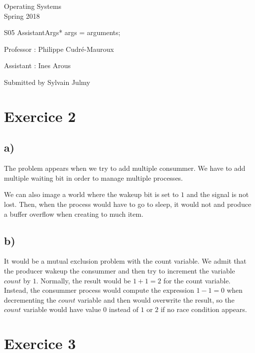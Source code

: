 \documentclass[a4paper,11pt]{report}
\author{Sylvain Julmy}
\date{\today}
\begin{document}
\begin{center}
  \Large{
    Operating Systems\\
    Spring 2018
  }
  
  \noindent\makebox[\linewidth]{\rule{\linewidth}{0.4pt}}
  S05
  \noindent\makebox[\linewidth]{\rule{\linewidth}{0.4pt}}
    AssistantArgs* args = arguments;
  \begin{flushleft}
    Professor : Philippe Cudré-Mauroux

    Assistant : Ines Arous
  \end{flushleft}
  
  \noindent\makebox[\linewidth]{\rule{\linewidth}{0.4pt}}

  Submitted by Sylvain Julmy
  
  \noindent\makebox[\linewidth]{\rule{\textwidth}{1pt}}
\end{center}

\section*{Exercice 2}

\subsection*{a)}

The problem appears when we try to add multiple consummer. We have to add
multiple waiting bit in order to manage multiple processes.

We can also image a world where the wakeup bit is set to $1$ and the signal is
not lost. Then, when the process would have to go to sleep, it would not and
produce a buffer overflow when creating to much item.

\subsection*{b)}

It would be a mutual exclusion problem with the count variable. We admit that
the producer wakeup the consummer and then try to increment the variable $count$
by $1$. Normally, the result would be $1 + 1 = 2$ for the count variable.
Instead, the consummer process would compute the expression $1 - 1 = 0$ when
decrementing the $count$ variable and then would overwrite the result, so the
$count$ variable would have value $0$ instead of $1$ or $2$ if no race condition
appears.

\section*{Exercice 3}
\end{document}
